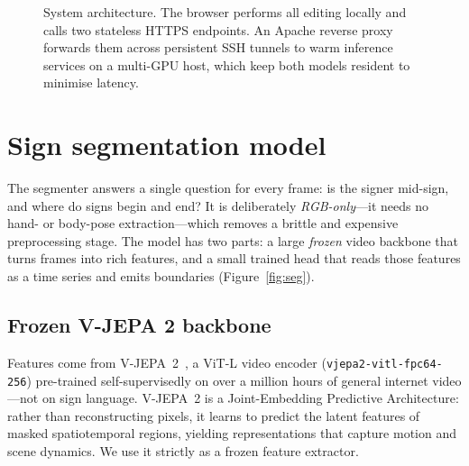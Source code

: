 \documentclass[11pt]{article}
\newcommand{\code}[1]{\texttt{\small #1}}
\begin{document}
\begin{figure}[t]
\centering
{}
\caption{System architecture. The browser performs all editing locally and calls two stateless
HTTPS endpoints. An Apache reverse proxy forwards them across persistent SSH tunnels to warm
inference services on a multi-GPU host, which keep both models resident to minimise latency.}
\label{fig:arch}
\end{figure}

\section{Sign segmentation model}\label{sec:seg}
The segmenter answers a single question for every frame: is the signer mid-sign, and where do
signs begin and end? It is deliberately \emph{RGB-only}---it needs no hand- or body-pose
extraction---which removes a brittle and expensive preprocessing stage. The model has two parts:
a large \emph{frozen} video backbone that turns frames into rich features, and a small trained
head that reads those features as a time series and emits boundaries (Figure~\ref{fig:seg}).

\subsection{Frozen V-JEPA 2 backbone}
Features come from V-JEPA~2~\cite{vjepa2}, a ViT-L video encoder
(\code{vjepa2-vitl-fpc64-256}) pre-trained self-supervisedly on over a million hours of general
internet video---not on sign language. V-JEPA~2 is a Joint-Embedding Predictive Architecture:
rather than reconstructing pixels, it learns to predict the latent features of masked
spatiotemporal regions, yielding representations that capture motion and scene dynamics. We use
it strictly as a frozen feature extractor.
\end{document}
